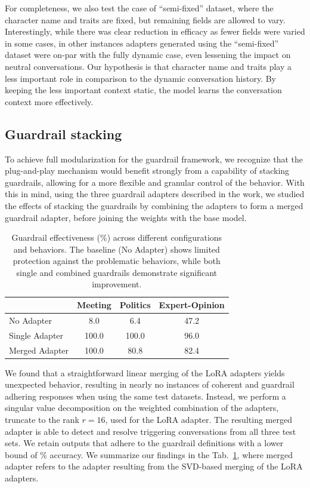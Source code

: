 \documentclass[letterpaper]{article}
\newcommand{\baselineMeeting}{8.0}
\newcommand{\baselinePolitics}{6.4}
\newcommand{\baselineExpert}{47.2}
\newcommand{\singleAdapterMeetingLora}{100.0}
\newcommand{\singleAdapterPoliticsLora}{100.0}
\newcommand{\singleAdapterExpertLora}{96.0}
\newcommand{\guardrailMergedEfficiencyMeeting}{100.0}
\newcommand{\guardrailMergedEfficiencyPolitics}{80.8}
\newcommand{\guardrailMergedEfficiencyExpert}{82.4}
\begin{document}
For completeness, we also test the case of ``semi-fixed'' dataset, where the character name and traits are fixed, but remaining fields are allowed to vary. 
Interestingly, while there was clear reduction in efficacy as fewer fields were varied in some cases, in other instances adapters generated using the ``semi-fixed'' dataset were on-par with the fully dynamic case, even lessening the impact on neutral conversations.
Our hypothesis is that character name and traits play a less important role in comparison to the dynamic conversation history. By keeping the less important context static, the model learns the conversation context more effectively.

\subsection{Guardrail stacking}
To achieve full modularization for the guardrail framework, we recognize that the plug-and-play mechanism would benefit strongly from a capability of stacking guardrails, allowing for a more flexible and granular control of the behavior. 
With this in mind, using the three guardrail adapters described in the work, we studied the effects of stacking the guardrails by combining the adapters to form a merged guardrail adapter, before joining the weights with the base model. 

\begin{table}[ht]
	\centering
	\begin{tabular}{lccc}
		\toprule
		& Meeting & Politics & Expert-Opinion \\
		\midrule
		No Adapter & \baselineMeeting& \baselinePolitics& \baselineExpert\\
		Single Adapter & \singleAdapterMeetingLora& \singleAdapterPoliticsLora& \singleAdapterExpertLora\\
		Merged Adapter & \guardrailMergedEfficiencyMeeting& \guardrailMergedEfficiencyPolitics& \guardrailMergedEfficiencyExpert\\
		\bottomrule
	\end{tabular}
	\caption{Guardrail effectiveness (\%) across different configurations and behaviors. The baseline (No Adapter) shows limited protection against the problematic behaviors, while both single and combined guardrails demonstrate significant improvement.}\label{tab:guardrail-effectiveness}
\end{table}

We found that a straightforward linear merging of the LoRA adapters yields unexpected behavior, resulting in nearly no instances of coherent and guardrail adhering responses when using the same test datasets. 
Instead, we perform a singular value decomposition on the weighted combination of the adapters, truncate to the rank $r=16$, used for the LoRA adapter. The resulting merged adapter is able to detect and resolve triggering conversations from all three test sets. 
We retain outputs that adhere to the guardrail definitions with a lower bound of \minGuardrailMergedEfficiency\% accuracy. We summarize our findings in the Tab.~\ref{tab:guardrail-effectiveness}, where merged adapter refers to the adapter resulting from the SVD-based merging of the LoRA adapters.
\end{document}
